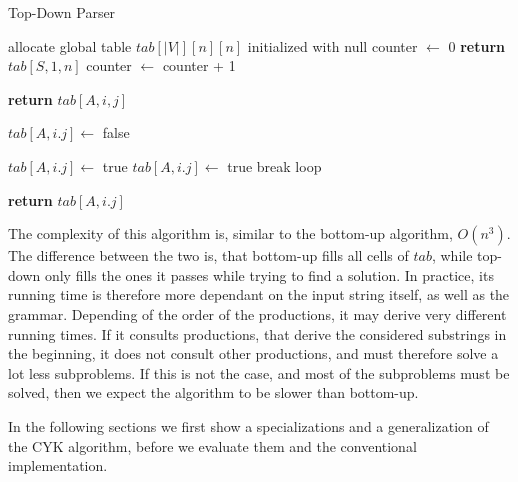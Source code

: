 \begin{algorithm}[H]
    \caption{Top-Down Parser}
    \label{alg:td}
    \begin{algorithmic}[1]
        \State allocate global table $tab[|V|][n][n]$ initialized with null
        \State counter $\leftarrow$ 0
        \State {}
        \State \textbf{return} $tab[S,1,n]$
        \EndFunction
            \State counter $\leftarrow$ counter + 1

                \State \textbf{return} $tab[A,i,j]$
            \EndIf

            \State $tab[A,i.j]\leftarrow$ false

                    \State $tab[A,i.j]\leftarrow$ true
                \EndIf
            \Else
                        \State $tab[A,i.j]\leftarrow$ true
                        \State break loop
                        \EndIf
                    \EndFor
                \EndFor
            \EndIf

            \State \textbf{return} $tab[A,i.j]$
        \EndFunction
    \end{algorithmic}
\end{algorithm}

The complexity of this algorithm is, similar to the bottom-up algorithm, $O(n^3)$.
The difference between the two is, that bottom-up fills all cells of $tab$, while top-down only fills the ones it passes while trying to find a solution.
In practice, its running time is therefore more dependant on the input string itself, as well as the grammar.
Depending of the order of the productions, it may derive very different running times.
If it consults productions, that derive the considered substrings in the beginning, it does not consult other productions, and must therefore solve a lot less subproblems.
If this is not the case, and most of the subproblems must be solved, then we expect the algorithm to be slower than bottom-up.

In the following sections we first show a specializations and a generalization of the CYK algorithm, before we evaluate them and the conventional implementation.
 

